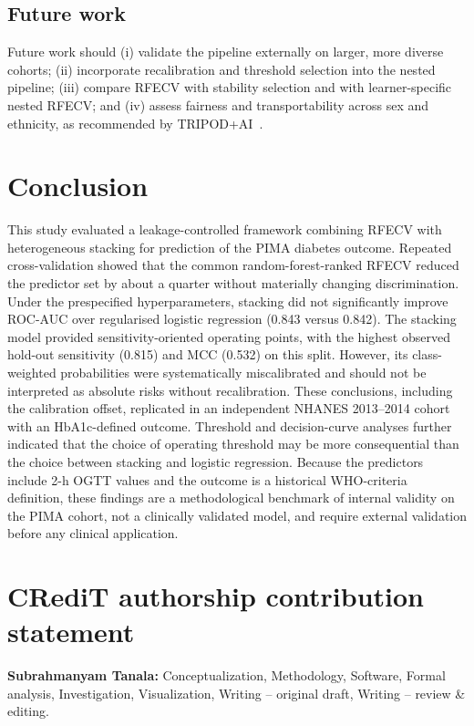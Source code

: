 \documentclass[preprint,12pt,authoryear=false]{elsarticle}
\begin{document}
\subsection{Future work}
Future work should (i) validate the pipeline externally on larger, more diverse cohorts; (ii) incorporate recalibration and threshold selection into the nested pipeline; (iii) compare RFECV with stability selection and with learner-specific nested RFECV; and (iv) assess fairness and transportability across sex and ethnicity, as recommended by TRIPOD+AI~\cite{collins2024tripodai}.
\section{Conclusion}
\label{sec:conclusion}

This study evaluated a leakage-controlled framework combining RFECV with heterogeneous stacking for prediction of the PIMA diabetes outcome. Repeated cross-validation showed that the common random-forest-ranked RFECV reduced the predictor set by about a quarter without materially changing discrimination. Under the prespecified hyperparameters, stacking did not significantly improve ROC-AUC over regularised logistic regression (0.843 versus 0.842). The stacking model provided sensitivity-oriented operating points, with the highest observed hold-out sensitivity (0.815) and MCC (0.532) on this split. However, its class-weighted probabilities were systematically miscalibrated and should not be interpreted as absolute risks without recalibration. These conclusions, including the calibration offset, replicated in an independent NHANES 2013--2014 cohort with an HbA1c-defined outcome. Threshold and decision-curve analyses further indicated that the choice of operating threshold may be more consequential than the choice between stacking and logistic regression. Because the predictors include 2-h OGTT values and the outcome is a historical WHO-criteria definition, these findings are a methodological benchmark of internal validity on the PIMA cohort, not a clinically validated model, and require external validation before any clinical application.
\section*{CRediT authorship contribution statement}
\textbf{Subrahmanyam Tanala:} Conceptualization, Methodology, Software, Formal analysis, Investigation, Visualization, Writing -- original draft, Writing -- review \& editing.
\end{document}
